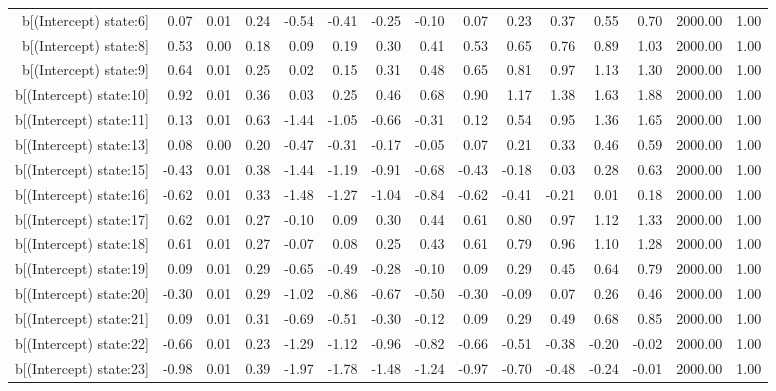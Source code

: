 \begin{table}[ht]
\begin{tabular}{rrrrrrrrrrrrrrr}
  b[(Intercept) state:6] & 0.07 & 0.01 & 0.24 & -0.54 & -0.41 & -0.25 & -0.10 & 0.07 & 0.23 & 0.37 & 0.55 & 0.70 & 2000.00 & 1.00 \\ 
  b[(Intercept) state:8] & 0.53 & 0.00 & 0.18 & 0.09 & 0.19 & 0.30 & 0.41 & 0.53 & 0.65 & 0.76 & 0.89 & 1.03 & 2000.00 & 1.00 \\ 
  b[(Intercept) state:9] & 0.64 & 0.01 & 0.25 & 0.02 & 0.15 & 0.31 & 0.48 & 0.65 & 0.81 & 0.97 & 1.13 & 1.30 & 2000.00 & 1.00 \\ 
  b[(Intercept) state:10] & 0.92 & 0.01 & 0.36 & 0.03 & 0.25 & 0.46 & 0.68 & 0.90 & 1.17 & 1.38 & 1.63 & 1.88 & 2000.00 & 1.00 \\ 
  b[(Intercept) state:11] & 0.13 & 0.01 & 0.63 & -1.44 & -1.05 & -0.66 & -0.31 & 0.12 & 0.54 & 0.95 & 1.36 & 1.65 & 2000.00 & 1.00 \\ 
  b[(Intercept) state:13] & 0.08 & 0.00 & 0.20 & -0.47 & -0.31 & -0.17 & -0.05 & 0.07 & 0.21 & 0.33 & 0.46 & 0.59 & 2000.00 & 1.00 \\ 
  b[(Intercept) state:15] & -0.43 & 0.01 & 0.38 & -1.44 & -1.19 & -0.91 & -0.68 & -0.43 & -0.18 & 0.03 & 0.28 & 0.63 & 2000.00 & 1.00 \\ 
  b[(Intercept) state:16] & -0.62 & 0.01 & 0.33 & -1.48 & -1.27 & -1.04 & -0.84 & -0.62 & -0.41 & -0.21 & 0.01 & 0.18 & 2000.00 & 1.00 \\ 
  b[(Intercept) state:17] & 0.62 & 0.01 & 0.27 & -0.10 & 0.09 & 0.30 & 0.44 & 0.61 & 0.80 & 0.97 & 1.12 & 1.33 & 2000.00 & 1.00 \\ 
  b[(Intercept) state:18] & 0.61 & 0.01 & 0.27 & -0.07 & 0.08 & 0.25 & 0.43 & 0.61 & 0.79 & 0.96 & 1.10 & 1.28 & 2000.00 & 1.00 \\ 
  b[(Intercept) state:19] & 0.09 & 0.01 & 0.29 & -0.65 & -0.49 & -0.28 & -0.10 & 0.09 & 0.29 & 0.45 & 0.64 & 0.79 & 2000.00 & 1.00 \\ 
  b[(Intercept) state:20] & -0.30 & 0.01 & 0.29 & -1.02 & -0.86 & -0.67 & -0.50 & -0.30 & -0.09 & 0.07 & 0.26 & 0.46 & 2000.00 & 1.00 \\ 
  b[(Intercept) state:21] & 0.09 & 0.01 & 0.31 & -0.69 & -0.51 & -0.30 & -0.12 & 0.09 & 0.29 & 0.49 & 0.68 & 0.85 & 2000.00 & 1.00 \\ 
  b[(Intercept) state:22] & -0.66 & 0.01 & 0.23 & -1.29 & -1.12 & -0.96 & -0.82 & -0.66 & -0.51 & -0.38 & -0.20 & -0.02 & 2000.00 & 1.00 \\ 
  b[(Intercept) state:23] & -0.98 & 0.01 & 0.39 & -1.97 & -1.78 & -1.48 & -1.24 & -0.97 & -0.70 & -0.48 & -0.24 & -0.01 & 2000.00 & 1.00 \\ 

\end{tabular}
\end{table}
